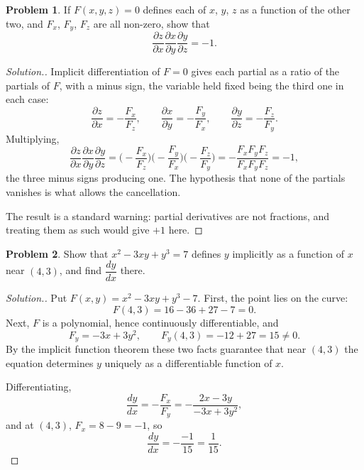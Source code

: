 \documentclass[11pt,a4paper]{article}
\theoremstyle{definition}
\newtheorem{problemx}{Problem}[subsection]
\newenvironment{problem}{\begin{problemx}}{\end{problemx}}
\newenvironment{solution}
  {\renewcommand{\qedsymbol}{}\begin{proof}[\textit{Solution}.]}
  {\end{proof}}
\begin{document}
\begin{problem}
If $F(x,y,z) = 0$ defines each of $x$, $y$, $z$ as a function of the other two,
and $F_x$, $F_y$, $F_z$ are all non-zero, show that
$$\frac{\partial z}{\partial x}\frac{\partial x}{\partial y}
\frac{\partial y}{\partial z} = -1 .$$
\end{problem}
\begin{solution}
Implicit differentiation of $F = 0$ gives each partial as a ratio of the
partials of $F$, with a minus sign, the variable held fixed being the third one
in each case:
$$\frac{\partial z}{\partial x} = -\frac{F_x}{F_z},\qquad
\frac{\partial x}{\partial y} = -\frac{F_y}{F_x},\qquad
\frac{\partial y}{\partial z} = -\frac{F_z}{F_y}.$$
Multiplying,
$$\frac{\partial z}{\partial x}\frac{\partial x}{\partial y}
\frac{\partial y}{\partial z}
= \Big(-\frac{F_x}{F_z}\Big)\Big(-\frac{F_y}{F_x}\Big)\Big(-\frac{F_z}{F_y}\Big)
= -\frac{F_xF_yF_z}{F_xF_yF_z} = -1 ,$$
the three minus signs producing one. The hypothesis that none of the partials
vanishes is what allows the cancellation.

The result is a standard warning: partial derivatives are not fractions, and
treating them as such would give $+1$ here.
\end{solution}

\begin{problem}
Show that $x^2-3xy+y^3 = 7$ defines $y$ implicitly as a function of $x$ near
$(4,3)$, and find $\dfrac{dy}{dx}$ there.
\end{problem}
\begin{solution}
Put $F(x,y) = x^2-3xy+y^3-7$. First, the point lies on the curve:
$$F(4,3) = 16 - 36 + 27 - 7 = 0 .$$
Next, $F$ is a polynomial, hence continuously differentiable, and
$$F_y = -3x+3y^2 ,\qquad F_y(4,3) = -12+27 = 15 \neq 0 .$$
By the implicit function theorem these two facts guarantee that near $(4,3)$ the
equation determines $y$ uniquely as a differentiable function of $x$.

Differentiating,
$$\frac{dy}{dx} = -\frac{F_x}{F_y} = -\frac{2x-3y}{-3x+3y^2} ,$$
and at $(4,3)$, $F_x = 8-9 = -1$, so
$$\frac{dy}{dx} = -\frac{-1}{15} = \frac{1}{15}.$$
\end{solution}
\end{document}
